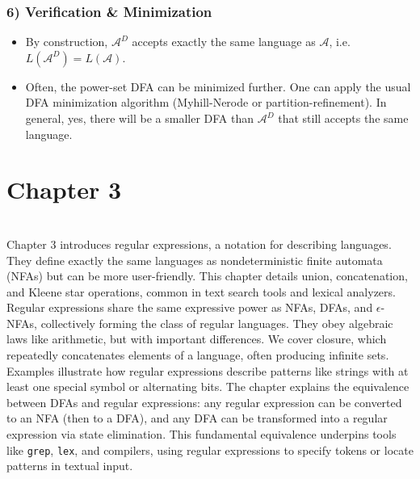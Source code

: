 \documentclass{article}
\theoremstyle{theorem}
\theoremstyle{definition}
\theoremstyle{remark}
\begin{document}
\subsubsection*{6) Verification \& Minimization}
\begin{itemize}
\item By construction, $\mathcal{A}^D$ accepts exactly the same language as $\mathcal{A}$, i.e.\ $L(\mathcal{A}^D) = L(\mathcal{A})$.
\item Often, the power-set DFA can be minimized further.  One can apply the usual DFA minimization algorithm (Myhill-Nerode or partition-refinement).  In general, yes, there will be a smaller DFA than $\mathcal{A}^D$ that still accepts the same language.
\end{itemize}

\section{Chapter 3}\\

Chapter 3 introduces regular expressions, a notation for describing languages. They define exactly the same languages as nondeterministic finite automata (NFAs) but can be more user-friendly. This chapter details union, concatenation, and Kleene star operations, common in text search tools and lexical analyzers. Regular expressions share the same expressive power as NFAs, DFAs, and $\epsilon$-NFAs, collectively forming the class of regular languages. They obey algebraic laws like arithmetic, but with important differences. We cover closure, which repeatedly concatenates elements of a language, often producing infinite sets. Examples illustrate how regular expressions describe patterns like strings with at least one special symbol or alternating bits. The chapter explains the equivalence between DFAs and regular expressions: any regular expression can be converted to an NFA (then to a DFA), and any DFA can be transformed into a regular expression via state elimination. This fundamental equivalence underpins tools like \texttt{grep}, \texttt{lex}, and compilers, using regular expressions to specify tokens or locate patterns in textual input.

\noindent
\end{document}
